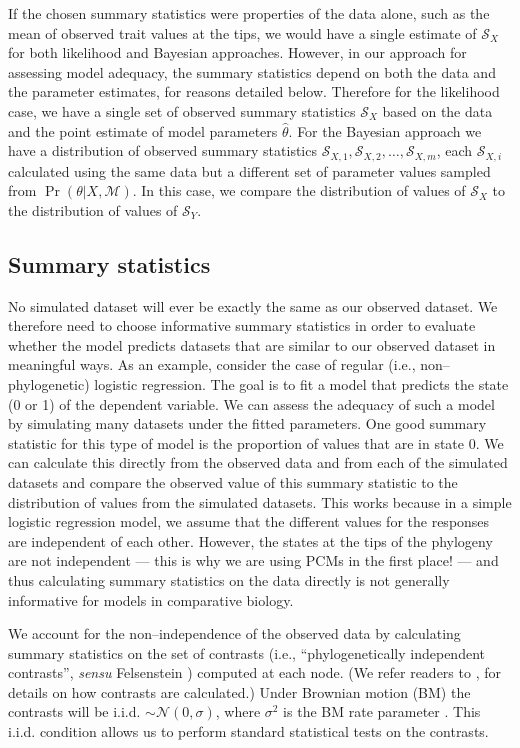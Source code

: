 \documentclass[a4paper,12pt]{article}
\begin{document}
If the chosen summary statistics were properties of the data alone, such as the mean of observed trait values at the tips, we would have a single estimate of $\mathcal{S}_X$ for both likelihood and Bayesian approaches. However, in our approach for assessing model adequacy, the summary statistics depend on both the data and the parameter estimates, for reasons detailed below. Therefore for the likelihood case, we have a single set of observed summary statistics $\mathcal{S}_X$ based on the data and the point estimate of model parameters $\hat{\theta}$. For the Bayesian approach we have a distribution of observed summary statistics $\mathcal{S}_{X,1}, \mathcal{S}_{X,2}, \ldots, \mathcal{S}_{X,m}$, each $\mathcal{S}_{X,i}$ calculated using the same data but a different set of parameter values sampled from $\Pr(\theta|X, \mathcal{M})$. In this case, we compare the distribution of values of $\mathcal{S}_X$ to the distribution of values of $\mathcal{S}_Y$.

\subsection{Summary statistics}
No simulated dataset will ever be exactly the same as our observed dataset. We therefore need to choose informative summary statistics in order to evaluate whether the model predicts datasets that are similar to our observed dataset in meaningful ways. As an example, consider the case of regular (i.e., non--phylogenetic) logistic regression. The goal is to fit a model that predicts the state (0 or 1) of the dependent variable. We can assess the adequacy of such a model by simulating many datasets under the fitted parameters. One good summary statistic for this type of model is the proportion of values that are in state 0. We can calculate this directly from the observed data and from each of the simulated datasets and compare the observed value of this summary statistic to the distribution of values from the simulated datasets. This works because in a simple logistic regression model, we assume that the different values for the responses are independent of each other. However, the states at the tips of the phylogeny are not independent --- this is why we are using PCMs in the first place! --- and thus calculating summary statistics on the data directly is not generally informative for models in comparative biology. 

We account for the non--independence of the observed data by calculating summary statistics on the set of contrasts (i.e., ``phylogenetically independent contrasts'', \emph{sensu} Felsenstein \citep{Felsenstein1985}) computed at each node. (We refer readers to \citep{Felsenstein1985, Rohlf2001, Blomberg2012}, for details on how contrasts are calculated.) Under Brownian motion (BM) the contrasts will be i.i.d. $\sim \mathcal{N}(0, \sigma)$, where $\sigma^2$ is the BM rate parameter \citep{Felsenstein1985}. This i.i.d. condition allows us to perform standard statistical tests on the contrasts. 
\end{document}
